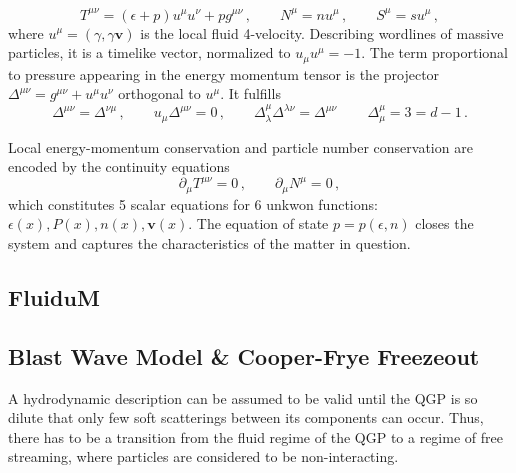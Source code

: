 \begin{equation}
        T^{\mu\nu}=(\epsilon+p)u^\mu u^\nu+pg^{\mu\nu}\,,\qquad
        N^\mu       =nu^\mu\,,\qquad
        S^\mu       =su^\mu\,,
    \end{equation}
where $u^\mu=(\gamma,\gamma\mathbf{v})$ is the local fluid 4-velocity. Describing wordlines of massive particles, it is a timelike vector, normalized to ${u_\mu u^\mu=-1}$. The term proportional to pressure appearing in the energy momentum tensor is the projector ${\Delta^{\mu\nu}=g^{\mu\nu}+u^\mu u^\nu}$ orthogonal to $u^\mu$. It fulfills
\begin{equation}
    \Delta^{\mu\nu}=\Delta^{\nu\mu}\,,\qquad u_\mu\Delta^{\mu\nu}=0\,,\qquad\Delta^\mu_\lambda\Delta^{\lambda\nu}=\Delta^{\mu\nu}\,\qquad\Delta^\mu_\mu=3=d-1\,.
    \label{eq:FluidMechanics_ProjProperties}
\end{equation}

Local energy-momentum conservation and particle number conservation are encoded by the continuity equations
    \begin{equation}
        \partial_\mu T^{\mu\nu}  =0\,,\qquad
        \partial_\mu N^\mu       =0\,,
    \end{equation}
which constitutes 5 scalar equations for 6 unkwon functions: $\epsilon(x), P(x), n(x), \mathbf{v}(x)$. The equation of state $p=p(\epsilon,n)$ closes the system and captures the characteristics of the matter in question.




\subsection{Fluid$\mathbf{u}$M}


\subsection{Blast Wave Model \& Cooper-Frye Freezeout}

A hydrodynamic description can be assumed to be valid until the QGP is so dilute that only few soft scatterings between its components can occur. Thus, there has to be a transition from the fluid regime of the QGP to a regime of free streaming, where particles are considered to be non-interacting.

